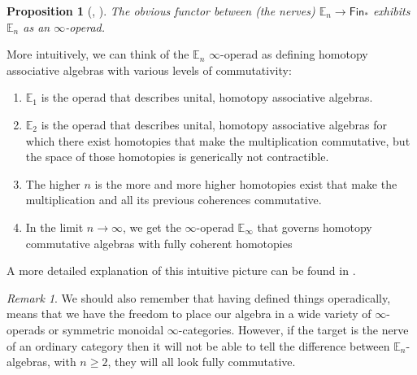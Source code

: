 \documentclass[12pt,a4paper]{article}
\newcounter{counter} \numberwithin{counter}{section}
\theoremstyle{definition}
\theoremstyle{plain}
\newtheorem{proposition}[counter]{Proposition}
\theoremstyle{remark}
\newtheorem{remark}[counter]{Remark}
\begin{document}
\begin{appendices}
\begin{proposition}[{\cite[prop.5.1.0.3]{lurie_ha}, \cite[cor.1.1.5.12]{lurie_htt}}]
    The obvious functor between (the nerves) $\mathbb{E}_n \rightarrow \mathsf{Fin}_*$ exhibits $\mathbb{E}_n$ as an $\infty$-operad.
\end{proposition}

More intuitively, we can think of the $\mathbb{E}_n$ $\infty$-operad as defining homotopy associative algebras with various levels of commutativity:
%
\begin{enumerate}
    \item $\mathbb{E}_1$ is the operad that describes unital, homotopy associative algebras.
    \item $\mathbb{E}_2$ is the operad that describes unital, homotopy associative algebras for which there exist homotopies that make the multiplication commutative, but the space of those homotopies is generically not contractible.
    \item The higher $n$ is the more and more higher homotopies exist that make the multiplication and all its previous coherences commutative.
    \item In the limit $n \rightarrow \infty$, we get the $\infty$-operad $\mathbb{E}_{\infty}$ that governs homotopy commutative algebras with fully coherent homotopies
\end{enumerate}

A more detailed explanation of this intuitive picture can be found in \cite{tanaka20}.

\begin{remark}
    We should also remember that having defined things operadically, means that we have the freedom to place our algebra in a wide variety of $\infty$-operads or symmetric monoidal $\infty$-categories. However, if the target is the nerve of an ordinary category then it will not be able to tell the difference between $\mathbb{E}_n$-algebras, with $n \geq 2$, they will all look fully commutative.
\end{remark}

\end{appendices}








\newpage
\printbibliography
\end{document}
